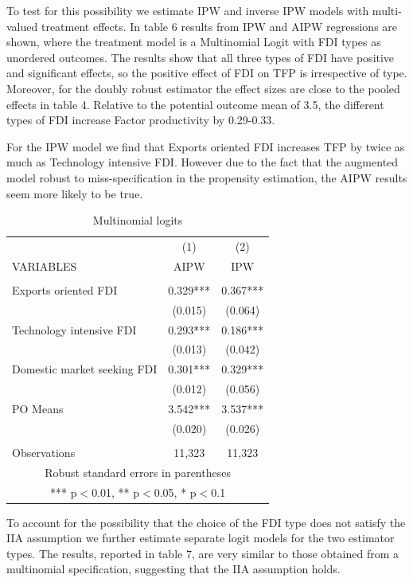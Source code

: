 \documentclass[a4paper,12pt]{scrartcl}
\begin{document}
To test for this possibility we estimate IPW and inverse IPW models with multi-valued treatment effects. In table 6 results from IPW and AIPW regressions are shown, where the treatment model is a Multinomial Logit with FDI types as unordered outcomes. The results show that all three types of FDI have positive and significant effects, so the positive effect of FDI on TFP is irrespective of type. Moreover, for the doubly robust estimator the effect sizes are close to the pooled effects in table 4. Relative to the potential outcome mean of 3.5, the different types of FDI increase Factor productivity by 0.29-0.33. 

For the IPW model we find that Exports oriented FDI increases TFP by twice as much as Technology intensive FDI. However due to the fact that the augmented model robust to miss-specification in the propensity estimation, the AIPW results seem more likely to be true. 



\begin{table}

  \centering
   \caption{Multinomial logits} 
  \label{} 
  \begin{tabular}{lcc} \hline
 & (1) & (2)  \\
VARIABLES & AIPW & IPW \\ \hline
 &    &  \\
Exports oriented FDI & 0.329*** &   0.367***   \\
 & (0.015)   & (0.064)  \\
Technology intensive FDI & 0.293*** &   0.186***   \\
 & (0.013)   & (0.042)   \\
Domestic market seeking FDI  & 0.301*** &   0.329***  \\
 & (0.012) &  (0.056)   \\
PO Means & 3.542***  & 3.537***    \\
 &   (0.020) &   (0.026) \\
 &  &      \\
 Observations & 11,323  & 11,323  \\ \hline
\multicolumn{3}{c}{ Robust standard errors in parentheses} \\
\multicolumn{3}{c}{ *** p$<$0.01, ** p$<$0.05, * p$<$0.1} \\
\end{tabular}
\end{table}




To account for the possibility that the choice of the FDI type does not satisfy the IIA assumption we further estimate separate logit models for the two estimator types. The results, reported in table 7, are very similar to those obtained from a multinomial specification, suggesting that the IIA assumption holds. 
\end{document}

